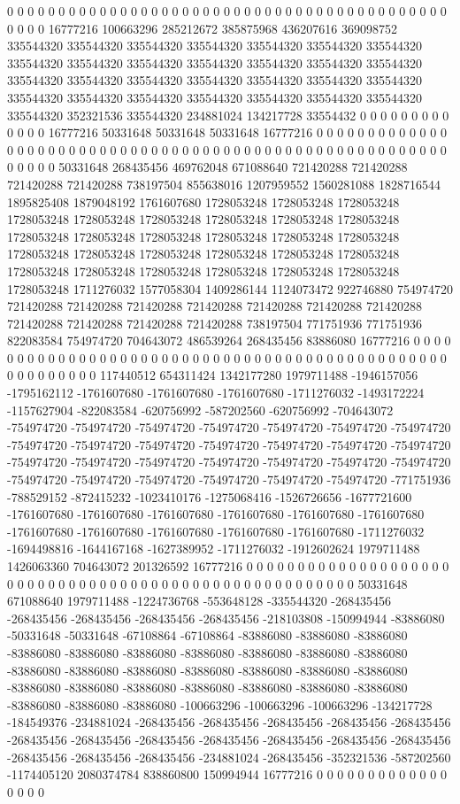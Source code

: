 0 0 0 0 0 0 0 0 0 0 0 0 0 0 0 0 0 0 0 0 0 0 0 0 0 0 0 0 0 0 0 0 0 0 0 0 0 0 0 0 0 0 0 0 0 0 0 16777216 100663296 285212672 385875968 436207616 369098752 335544320 335544320 335544320 335544320 335544320 335544320 335544320 335544320 335544320 335544320 335544320 335544320 335544320 335544320 335544320 335544320 335544320 335544320 335544320 335544320 335544320 335544320 335544320 335544320 335544320 335544320 335544320 335544320 335544320 352321536 335544320 234881024 134217728 33554432 0 0 0 0 0 0 0 0 0 0 0 0 0 16777216 50331648 50331648 50331648 16777216 0 0 0 0 0 0 0 0 0 0 0 0 0 0 0 0 0 0 0 0 0 0 0
0 0 0 0 0 0 0 0 0 0 0 0 0 0 0 0 0 0 0 0 0 0 0 0 0 0 0 0 0 0 0 0 0 0 0 0 0 0 50331648 268435456 469762048 671088640 721420288 721420288 721420288 721420288 738197504 855638016 1207959552 1560281088 1828716544 1895825408 1879048192 1761607680 1728053248 1728053248 1728053248 1728053248 1728053248 1728053248 1728053248 1728053248 1728053248 1728053248 1728053248 1728053248 1728053248 1728053248 1728053248 1728053248 1728053248 1728053248 1728053248 1728053248 1728053248 1728053248 1728053248 1728053248 1728053248 1728053248 1728053248 1728053248 1711276032 1577058304 1409286144 1124073472 922746880 754974720 721420288 721420288 721420288 721420288 721420288 721420288 721420288 721420288 721420288 721420288 721420288 738197504 771751936 771751936 822083584 754974720 704643072 486539264 268435456 83886080 16777216 0 0 0 0 0 0 0 0 0 0 0 0 0 0 0 0 0 0 0
0 0 0 0 0 0 0 0 0 0 0 0 0 0 0 0 0 0 0 0 0 0 0 0 0 0 0 0 0 0 0 0 0 0 0 0 0 117440512 654311424 1342177280 1979711488 -1946157056 -1795162112 -1761607680 -1761607680 -1761607680 -1711276032 -1493172224 -1157627904 -822083584 -620756992 -587202560 -620756992 -704643072 -754974720 -754974720 -754974720 -754974720 -754974720 -754974720 -754974720 -754974720 -754974720 -754974720 -754974720 -754974720 -754974720 -754974720 -754974720 -754974720 -754974720 -754974720 -754974720 -754974720 -754974720 -754974720 -754974720 -754974720 -754974720 -754974720 -754974720 -771751936 -788529152 -872415232 -1023410176 -1275068416 -1526726656 -1677721600 -1761607680 -1761607680 -1761607680 -1761607680 -1761607680 -1761607680 -1761607680 -1761607680 -1761607680 -1761607680 -1761607680 -1711276032 -1694498816 -1644167168 -1627389952 -1711276032 -1912602624 1979711488 1426063360 704643072 201326592 16777216 0 0 0 0 0 0 0 0 0 0 0 0 0 0 0 0 0 0
0 0 0 0 0 0 0 0 0 0 0 0 0 0 0 0 0 0 0 0 0 0 0 0 0 0 0 0 0 0 0 0 0 0 0 0 50331648 671088640 1979711488 -1224736768 -553648128 -335544320 -268435456 -268435456 -268435456 -268435456 -268435456 -218103808 -150994944 -83886080 -50331648 -50331648 -67108864 -67108864 -83886080 -83886080 -83886080 -83886080 -83886080 -83886080 -83886080 -83886080 -83886080 -83886080 -83886080 -83886080 -83886080 -83886080 -83886080 -83886080 -83886080 -83886080 -83886080 -83886080 -83886080 -83886080 -83886080 -83886080 -83886080 -83886080 -83886080 -100663296 -100663296 -100663296 -134217728 -184549376 -234881024 -268435456 -268435456 -268435456 -268435456 -268435456 -268435456 -268435456 -268435456 -268435456 -268435456 -268435456 -268435456 -268435456 -268435456 -268435456 -234881024 -268435456 -352321536 -587202560 -1174405120 2080374784 838860800 150994944 16777216 0 0 0 0 0 0 0 0 0 0 0 0 0 0 0 0 0
